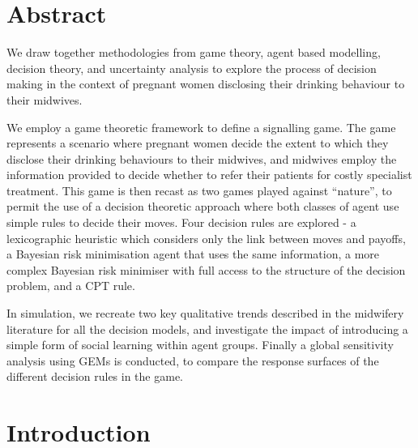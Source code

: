 \documentclass[graybox]{svmult}
\begin{document}
\section*{Abstract}

We draw together methodologies from game theory, agent based modelling, decision theory, and uncertainty analysis to explore the process of decision making in the context of pregnant women disclosing their drinking behaviour to their midwives.

We employ a game theoretic framework to define a signalling game. The game represents a scenario where pregnant women decide the extent to which they disclose their drinking behaviours to their midwives, and midwives employ the information provided to decide whether to refer their patients for costly specialist treatment. This game is then recast as two games played against \enquote{nature}, to permit the use of a decision theoretic approach where both classes of agent use simple rules to decide their moves.
Four decision rules are explored - a lexicographic heuristic which considers only the link between moves and payoffs, a Bayesian risk minimisation agent that uses the same information, a more complex Bayesian risk minimiser with full access to the structure of the decision problem, and a \ac{CPT} rule.

In simulation, we recreate two key qualitative trends described in the midwifery literature for all the decision models, and investigate the impact of introducing a simple form of social learning within agent groups.
Finally a global sensitivity analysis using \acp{GEM} is conducted, to compare the response surfaces of the different decision rules in the game. \acresetall

\section{Introduction}
\label{sec:intro}
\end{document}
